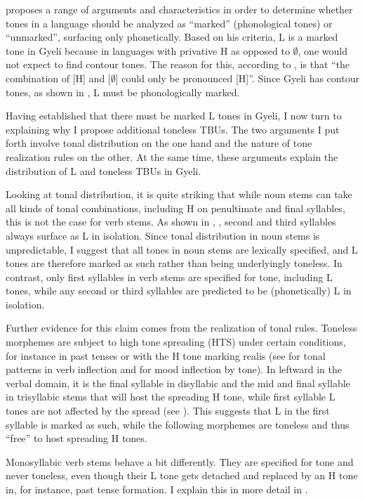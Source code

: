 \citet{hyman2001} proposes a range of arguments and characteristics in order to determine whether tones in a language should be analyzed as ``marked'' (phonological tones) or ``unmarked'', surfacing only phonetically. Based on his criteria, L is a marked tone in Gyeli because in languages with privative H as opposed to $\emptyset$, one would not expect to find contour tones. The reason for this, according to \citet[240]{hyman2001}, is that  ``the combination of [H] and [$\emptyset$] could only be pronounced [H]''. Since Gyeli has contour tones, as shown in , L must be phonologically marked.

Having established that there must be marked L tones in Gyeli, I now turn to explaining why I propose additional toneless TBUs. The two arguments I put forth involve tonal distribution on the one hand and the nature of tone realization rules on the other. At the same time, these arguments explain the distribution of L and toneless TBUs in Gyeli.

Looking at tonal distribution, it is quite striking that while noun stems can take all kinds of tonal combinations, including H on penultimate and final syllables, this is not the case for verb stems. As shown in , , second and third syllables always surface as L in isolation. Since tonal distribution in noun stems is unpredictable, I suggest that all tones in noun stems are lexically specified, and L tones are therefore marked as such rather than being underlyingly toneless. In contrast, only first syllables in verb stems are specified for tone, including L tones, while any second or third syllables are predicted to be (phonetically) L in isolation.

 Further evidence for this claim comes from the realization of tonal rules. Toneless morphemes are subject to high tone spreading (HTS) under certain conditions, for instance in past tenses or with the H tone marking realis (see  for tonal patterns in verb inflection and  for mood inflection by tone). In leftward {\HTS} in the verbal domain, it is the final syllable in disyllabic and the mid and final syllable in trisyllabic stems that will host the spreading H tone, while first syllable L tones are not affected by the spread (see ). This suggests that L in the first syllable is marked as such, while the following morphemes are toneless and thus ``free'' to host spreading H tones.

Monosyllabic verb stems behave a bit differently. They are specified for tone and never toneless, even though their L tone gets detached and replaced by an H tone in, for instance, past tense formation. I explain this in more detail in . 


